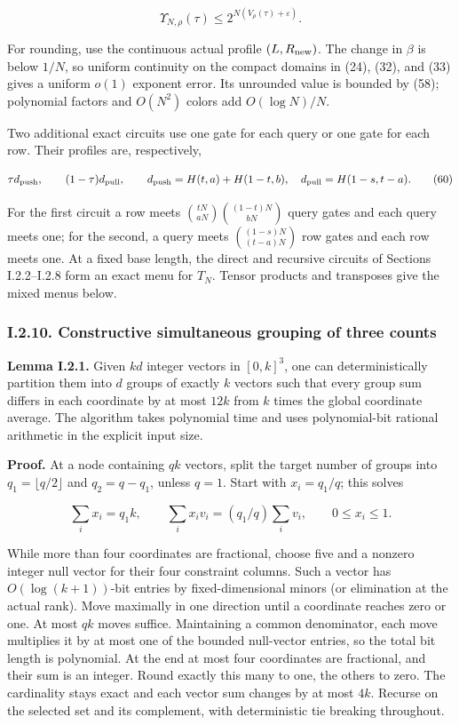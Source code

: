 \[
\Upsilon_{N,\rho}(\tau)\le2^{N(V_\rho(\tau)+\varepsilon)}.
\tag{59}
\]

For rounding, use the continuous actual profile \((L,R_{\rm new})\). The change in \(\beta\) is below \(1/N\), so uniform continuity on the compact domains in (24), (32), and (33) gives a uniform \(o(1)\) exponent error. Its unrounded value is bounded by (58); polynomial factors and \(O(N^2)\) colors add \(O(\log N)/N\).

Two additional exact circuits use one gate for each query or one gate for each row. Their profiles are, respectively,

\[
\tau d_{\rm push},\qquad (1-\tau)d_{\rm pull},\qquad
d_{\rm push}=H(t,a)+H(1-t,b),\quad
d_{\rm pull}=H(1-s,t-a).
\tag{60}
\]

For the first circuit a row meets \(\binom{tN}{aN}\binom{(1-t)N}{bN}\) query gates and each query meets one; for the second, a query meets \(\binom{(1-s)N}{(t-a)N}\) row gates and each row meets one. At a fixed base length, the direct and recursive circuits of Sections I.2.2--I.2.8 form an exact menu for \(T_N\). Tensor products and transposes give the mixed menus below.

\hypertarget{af-a9ec399514-i.2.10.-constructive-simultaneous-grouping-of-three-counts}{%
\subsubsection{I.2.10. Constructive simultaneous grouping of three counts}\label{af-a9ec399514-i.2.10.-constructive-simultaneous-grouping-of-three-counts}}

\textbf{Lemma I.2.1.} Given \(kd\) integer vectors in \([0,k]^3\), one can deterministically partition them into \(d\) groups of exactly \(k\) vectors such that every group sum differs in each coordinate by at most \(12k\) from \(k\) times the global coordinate average. The algorithm takes polynomial time and uses polynomial-bit rational arithmetic in the explicit input size.

\textbf{Proof.} At a node containing \(qk\) vectors, split the target number of groups into \(q_1=\lfloor q/2\rfloor\) and \(q_2=q-q_1\), unless \(q=1\). Start with \(x_i=q_1/q\); this solves

\[
\sum_i x_i=q_1k,\qquad
\sum_i x_i v_i=(q_1/q)\sum_i v_i,\qquad0\le x_i\le1.
\]

While more than four coordinates are fractional, choose five and a nonzero integer null vector for their four constraint columns. Such a vector has \(O(\log(k+1))\)-bit entries by fixed-dimensional minors (or elimination at the actual rank). Move maximally in one direction until a coordinate reaches zero or one. At most \(qk\) moves suffice. Maintaining a common denominator, each move multiplies it by at most one of the bounded null-vector entries, so the total bit length is polynomial. At the end at most four coordinates are fractional, and their sum is an integer. Round exactly this many to one, the others to zero. The cardinality stays exact and each vector sum changes by at most \(4k\). Recurse on the selected set and its complement, with deterministic tie breaking throughout.

